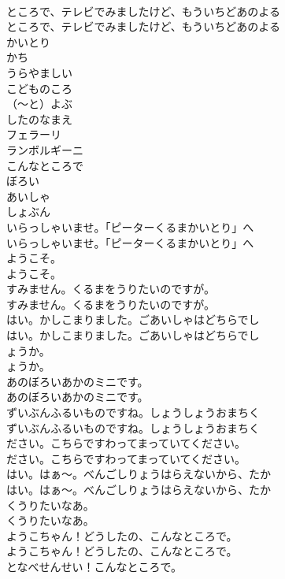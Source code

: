 \documentclass[8pt]{extreport}
\begin{document}
\begin{CJK}{UTF8}{min}
\\	ところで、テレビでみましたけど、もういちどあのよる	
\\	ところで、テレビでみましたけど、もういちどあのよる 
\\	かいとり
\\	かち
\\	うらやましい
\\	こどものころ
\\	（～と）よぶ
\\	したのなまえ
\\	フェラーリ
\\	ランボルギーニ
\\	こんなところで
\\	ぼろい
\\	あいしゃ
\\	しょぶん
\\	いらっしゃいませ。「ピーターくるまかいとり」へ	
\\	いらっしゃいませ。「ピーターくるまかいとり」へ 
\\	ようこそ。	
\\	ようこそ。 
\\	すみません。くるまをうりたいのですが。	
\\	すみません。くるまをうりたいのですが。 
\\	はい。かしこまりました。ごあいしゃはどちらでし	
\\	はい。かしこまりました。ごあいしゃはどちらでし 
\\	ょうか。	
\\	ょうか。 
\\	あのぼろいあかのミニです。	
\\	あのぼろいあかのミニです。 
\\	ずいぶんふるいものですね。しょうしょうおまちく	
\\	ずいぶんふるいものですね。しょうしょうおまちく 
\\	ださい。こちらですわってまっていてください。	
\\	ださい。こちらですわってまっていてください。 
\\	はい。はぁ～。べんごしりょうはらえないから、たか	
\\	はい。はぁ～。べんごしりょうはらえないから、たか 
\\	くうりたいなあ。	
\\	くうりたいなあ。 
\\	ようこちゃん！どうしたの、こんなところで。	
\\	ようこちゃん！どうしたの、こんなところで。 
\\	となべせんせい！こんなところで。	

\end{CJK}
\end{document}
